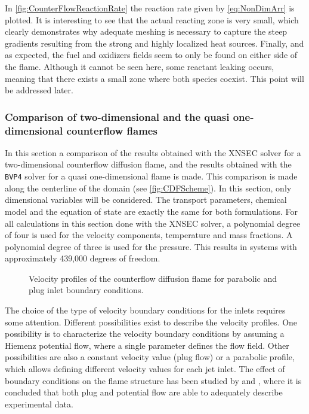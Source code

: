 In \cref{fig:CounterFlowReactionRate} the reaction rate given by \cref{eq:NonDimArr} is plotted. It is interesting to see that the actual reacting zone is very small, which clearly demonstrates why adequate meshing is necessary to capture the steep gradients resulting from the strong and highly localized heat sources. Finally, and as expected, the fuel and oxidizers fields seem to only be found on either side of the flame. Although it cannot be seen here, some reactant leaking occurs, meaning that there exists a small zone where both species coexist. This point will be addressed later. 


\subsubsection{Comparison of two-dimensional and the quasi one-dimensional counterflow flames}
In this section a comparison of the results obtained with the XNSEC solver for a two-dimensional  counterflow diffusion flame, and the results obtained with the \lstinline|BVP4| solver for a quasi one-dimensional flame is made. This comparison is made along the centerline of the domain (see \cref{fig:CDFScheme}). In this section, only dimensional variables will be considered. The transport parameters, chemical model and the equation of state are exactly the same for both formulations. For all calculations in this section done with the XNSEC solver, a polynomial degree of four is used for the velocity components, temperature and mass fractions. A polynomial degree of three is used for the pressure. This results in systems with approximately 439,000 degrees of freedom. 
 
\begin{figure}[t!]
	\centering
	\caption{Velocity profiles of the counterflow diffusion flame for parabolic and plug inlet boundary conditions.}\label{fig:CounterFlowFlame_DifferentBoundaryConditions}
\end{figure}

The choice of the type of velocity boundary conditions for the inlets requires some attention. Different possibilities exist to describe the velocity profiles. One possibility is to characterize the velocity boundary conditions by assuming a Hiemenz potential flow, where a single parameter defines the flow field. Other possibilities are also a constant velocity value (plug flow) or a parabolic profile, which allows defining different velocity values for each jet inlet.
The effect of boundary conditions on the flame structure has been studied by \textcite{chelliahExperimentalTheoreticalInvestigation1991} and \textcite{johnsonAxisymmetricCounterflowFlame2015}, where it is concluded that both plug and potential flow are able to adequately describe experimental data. 



